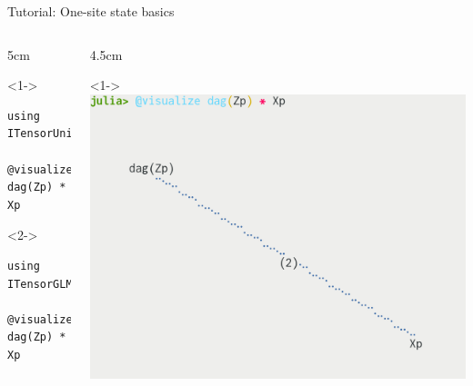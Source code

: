 \begin{frame}[fragile]{Tutorial: One-site state basics}

\begin{columns}

\begin{column}{5cm}

\begin{onlyenv}<1->
\vspace*{-1.0cm}
\begin{lstlisting}[language=JuliaLocal, style=julia, basicstyle=\scriptsize\ttfamily]
using ITensorUnicodePlots

@visualize dag(Zp) * Xp
\end{lstlisting}

\end{onlyenv}

\begin{onlyenv}<2->
\vspace*{1.5cm}
\begin{lstlisting}[language=JuliaLocal, style=julia, basicstyle=\scriptsize\ttfamily]
using ITensorGLMakie

@visualize dag(Zp) * Xp
\end{lstlisting}

\end{onlyenv}

\end{column}

\begin{column}{4.5cm}

\begin{onlyenv}<1->
\includegraphics[width=1.0\textwidth]{
  slides/assets/ZpXp_unicode.png
}
\end{onlyenv}


\end{column}
\end{columns}
\end{frame}
